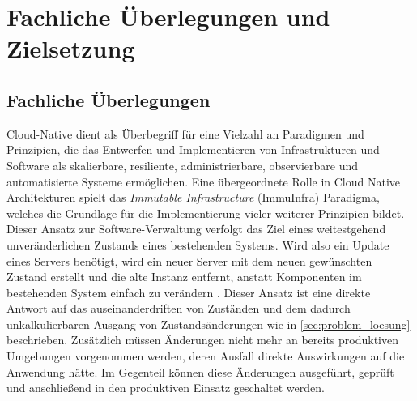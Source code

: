 \documentclass[11pt]{scrartcl}
\begin{document}
\section{\label{sec:fachliche_ueberlegungen} Fachliche Überlegungen und Zielsetzung}
\subsection{Fachliche Überlegungen}
Cloud-Native dient als Überbegriff für eine Vielzahl an Paradigmen und Prinzipien, die das Entwerfen und Implementieren von Infrastrukturen und Software als skalierbare, resiliente, administrierbare, observierbare und automatisierte Systeme ermöglichen. Eine übergeordnete Rolle in Cloud Native Architekturen spielt das \textit{Immutable Infrastructure} (ImmuInfra) Paradigma, welches die Grundlage für die Implementierung vieler weiterer Prinzipien bildet. Dieser Ansatz zur Software-Verwaltung verfolgt das Ziel eines weitestgehend unveränderlichen Zustands eines bestehenden Systems. Wird also ein Update eines Servers benötigt, wird ein neuer Server mit dem neuen gewünschten Zustand erstellt und die alte Instanz entfernt, anstatt Komponenten im bestehenden System einfach zu verändern \cite{Hirschfeld:2018}. 
Dieser Ansatz ist eine direkte Antwort auf das auseinanderdriften von Zuständen und dem dadurch unkalkulierbaren Ausgang von Zustandsänderungen wie in \cref{sec:problem_loesung} beschrieben. Zusätzlich müssen Änderungen nicht mehr an bereits produktiven Umgebungen vorgenommen werden, deren Ausfall direkte Auswirkungen auf die Anwendung hätte. Im Gegenteil können diese Änderungen ausgeführt, geprüft und anschließend in den produktiven Einsatz geschaltet werden.
\end{document}
